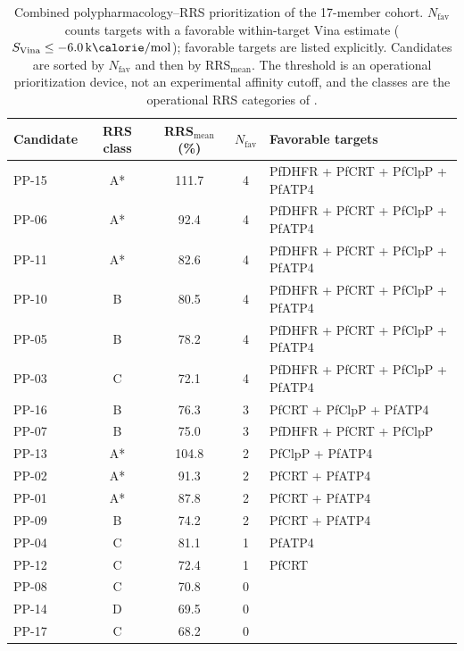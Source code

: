 \documentclass[journal=jcisd8,manuscript=article]{achemso}
\begin{document}
\begin{table}[htbp]
\centering
\caption{Combined polypharmacology--RRS prioritization of the 17-member cohort. $N_{\mathrm{fav}}$ counts targets with a favorable within-target Vina estimate ($S_{\mathrm{Vina}}\leq\qty{-6.0}{\kilo\calorie\per\mole}$); favorable targets are listed explicitly. Candidates are sorted by $N_{\mathrm{fav}}$ and then by RRS$_{\mathrm{mean}}$. The threshold is an operational prioritization device, not an experimental affinity cutoff, and the classes are the operational RRS categories of .}
\label{tab:dual_priority}
\small
\begin{tabular}{@{}lcccl@{}}
\toprule
Candidate & RRS class & RRS$_{\mathrm{mean}}$ (\%) & $N_{\mathrm{fav}}$ & Favorable targets \\
\midrule
PP-15 & A* & \num{111.7} & 4 & PfDHFR + PfCRT + PfClpP + PfATP4 \\
PP-06 & A* & \num{92.4} & 4 & PfDHFR + PfCRT + PfClpP + PfATP4 \\
PP-11 & A* & \num{82.6} & 4 & PfDHFR + PfCRT + PfClpP + PfATP4 \\
PP-10 & B & \num{80.5} & 4 & PfDHFR + PfCRT + PfClpP + PfATP4 \\
PP-05 & B & \num{78.2} & 4 & PfDHFR + PfCRT + PfClpP + PfATP4 \\
PP-03 & C & \num{72.1} & 4 & PfDHFR + PfCRT + PfClpP + PfATP4 \\
PP-16 & B & \num{76.3} & 3 & PfCRT + PfClpP + PfATP4 \\
PP-07 & B & \num{75.0} & 3 & PfDHFR + PfCRT + PfClpP \\
PP-13 & A* & \num{104.8} & 2 & PfClpP + PfATP4 \\
PP-02 & A* & \num{91.3} & 2 & PfCRT + PfATP4 \\
PP-01 & A* & \num{87.8} & 2 & PfCRT + PfATP4 \\
PP-09 & B & \num{74.2} & 2 & PfCRT + PfATP4 \\
PP-04 & C & \num{81.1} & 1 & PfATP4 \\
PP-12 & C & \num{72.4} & 1 & PfCRT \\
PP-08 & C & \num{70.8} & 0 & \textemdash{} \\
PP-14 & D & \num{69.5} & 0 & \textemdash{} \\
PP-17 & C & \num{68.2} & 0 & \textemdash{} \\
\bottomrule
\end{tabular}
\end{table}
\end{document}
